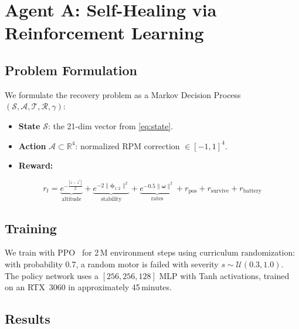 \documentclass[10pt,twocolumn]{article}
\begin{document}
\section{Agent A: Self-Healing via Reinforcement Learning}
\label{sec:agent_a}

\subsection{Problem Formulation}
We formulate the recovery problem as a Markov Decision Process
$(\mathcal{S}, \mathcal{A}, \mathcal{T}, \mathcal{R}, \gamma)$:
\begin{itemize}
    \item \textbf{State} $\mathcal{S}$: the 21-dim vector from
    \cref{eq:state}.
    \item \textbf{Action} $\mathcal{A} \subset \mathbb{R}^4$:
    normalized RPM correction $\in [-1, 1]^4$.
    \item \textbf{Reward:}
\end{itemize}

\begin{equation}
    r_t = \underbrace{e^{-\frac{|z-z^*|}{2}}}_{\text{altitude}}
    + \underbrace{e^{-2\|\boldsymbol{\phi}_{1:2}\|^2}}_{\text{stability}}
    + \underbrace{e^{-0.5\|\boldsymbol{\omega}\|^2}}_{\text{rates}}
    + r_\text{pos} + r_\text{survive} + r_\text{battery}
    \label{eq:reward}
\end{equation}

\subsection{Training}
We train with PPO~\cite{schulman2017proximal} for 2\,M environment
steps using curriculum randomization: with probability 0.7, a random
motor is failed with severity $s \sim \mathcal{U}(0.3, 1.0)$.
The policy network uses a $[256, 256, 128]$ MLP with Tanh activations,
trained on an RTX~3060 in approximately 45\,minutes.

\subsection{Results}
\end{document}
